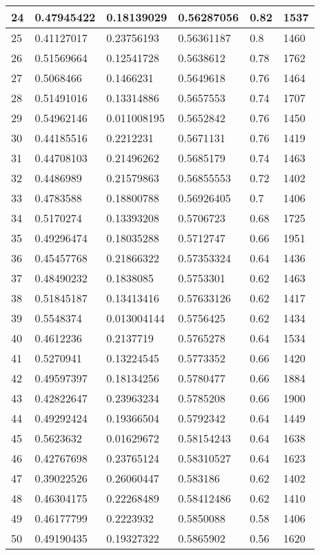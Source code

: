 \begin{longtable}{|l|l|l|l|l|l|}
24 & 0.47945422 & 0.18139029 & 0.56287056 & 0.82 & 1537 \\ \hline 
25 & 0.41127017 & 0.23756193 & 0.56361187 & 0.8 & 1460 \\ \hline 
26 & 0.51569664 & 0.12541728 & 0.5638612 & 0.78 & 1762 \\ \hline 
27 & 0.5068466 & 0.1466231 & 0.5649618 & 0.76 & 1464 \\ \hline 
28 & 0.51491016 & 0.13314886 & 0.5657553 & 0.74 & 1707 \\ \hline 
29 & 0.54962146 & 0.011008195 & 0.5652842 & 0.76 & 1450 \\ \hline 
30 & 0.44185516 & 0.2212231 & 0.5671131 & 0.76 & 1419 \\ \hline 
31 & 0.44708103 & 0.21496262 & 0.5685179 & 0.74 & 1463 \\ \hline 
32 & 0.4486989 & 0.21579863 & 0.56855553 & 0.72 & 1402 \\ \hline 
33 & 0.4783588 & 0.18800788 & 0.56926405 & 0.7 & 1406 \\ \hline 
34 & 0.5170274 & 0.13393208 & 0.5706723 & 0.68 & 1725 \\ \hline 
35 & 0.49296474 & 0.18035288 & 0.5712747 & 0.66 & 1951 \\ \hline 
36 & 0.45457768 & 0.21866322 & 0.57353324 & 0.64 & 1436 \\ \hline 
37 & 0.48490232 & 0.1838085 & 0.5753301 & 0.62 & 1463 \\ \hline 
38 & 0.51845187 & 0.13413416 & 0.57633126 & 0.62 & 1417 \\ \hline 
39 & 0.5548374 & 0.013004144 & 0.5756425 & 0.62 & 1434 \\ \hline 
40 & 0.4612236 & 0.2137719 & 0.5765278 & 0.64 & 1534 \\ \hline 
41 & 0.5270941 & 0.13224545 & 0.5773352 & 0.66 & 1420 \\ \hline 
42 & 0.49597397 & 0.18134256 & 0.5780477 & 0.66 & 1884 \\ \hline 
43 & 0.42822647 & 0.23963234 & 0.5785208 & 0.66 & 1900 \\ \hline 
44 & 0.49292424 & 0.19366504 & 0.5792342 & 0.64 & 1449 \\ \hline 
45 & 0.5623632 & 0.01629672 & 0.58154243 & 0.64 & 1638 \\ \hline 
46 & 0.42767698 & 0.23765124 & 0.58310527 & 0.64 & 1623 \\ \hline 
47 & 0.39022526 & 0.26060447 & 0.583186 & 0.62 & 1402 \\ \hline 
48 & 0.46304175 & 0.22268489 & 0.58412486 & 0.62 & 1410 \\ \hline 
49 & 0.46177799 & 0.2223932 & 0.5850088 & 0.58 & 1406 \\ \hline 
50 & 0.49190435 & 0.19327322 & 0.5865902 & 0.56 & 1620 \\ \hline 
\end{longtable}